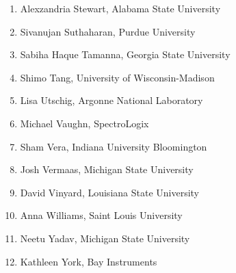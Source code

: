 \begin{multicols}{2}
\begin{enumerate}
\item Alexzandria	Stewart,	Alabama State University
\item Sivanujan	Suthaharan,	Purdue University
\item Sabiha Haque	Tamanna,	Georgia State University
\item Shimo	Tang,	University of Wisconsin-Madison
\item Lisa	Utschig,	Argonne National Laboratory
\item Michael	Vaughn,	SpectroLogix
\item Sham	Vera,	Indiana University Bloomington 
\item Josh	Vermaas,	Michigan State University
\item David	Vinyard,	Louisiana State University
\item Anna	Williams,	Saint Louis University
\item Neetu	Yadav,	Michigan State University
\item Kathleen	York,	Bay Instruments
	\end{enumerate}
\end{multicols}